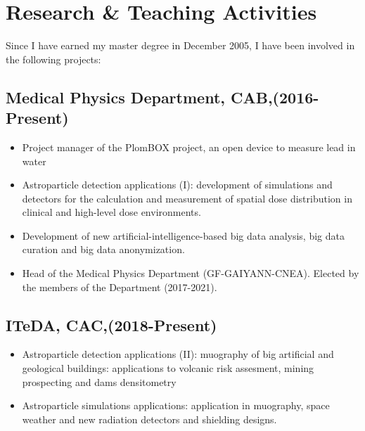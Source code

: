 \ifeng
\section*{Research \& Teaching Activities}

Since I have earned my master degree in December 2005, I have been involved in the following projects:

\subsection*{Medical Physics Department, CAB,(2016-Present)}
\begin{itemize}
	\item Project manager of the PlomBOX project, an open device to measure lead in water
	\item Astroparticle detection applications (I): development of
		simulations and detectors for the calculation and measurement
		of spatial dose distribution in clinical and high-level
		dose environments.
 	\item Development of new artificial-intelligence-based big data analysis, big data curation and big data anonymization.
	\item Head of the Medical Physics Department (GF-GAIYANN-CNEA). Elected by the members of the Department (2017-2021).
\end{itemize}

\subsection*{ITeDA, CAC,(2018-Present)}
\begin{itemize}
	\item Astroparticle detection applications (II): muography of big artificial and geological buildings: applications
	to volcanic risk assesment, mining prospecting and dams densitometry
	\item Astroparticle simulations applications: application in muography, space weather and new radiation detectors
	and shielding designs.
\end{itemize}

